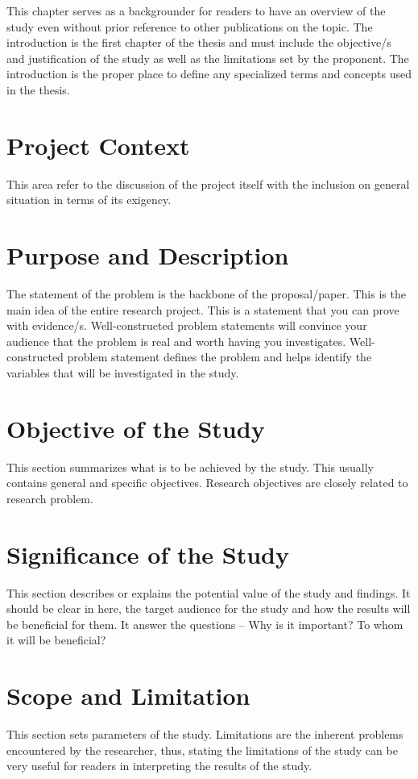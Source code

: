 This chapter serves as a backgrounder for readers to have an overview of the study even without prior reference to other publications on the topic. The introduction is the first chapter of the thesis and must include the objective/s and justification of the study as well as the limitations set by the proponent. The introduction is the proper place to define any specialized terms and concepts used in the thesis.
		
\section{Project Context}
This area refer to the discussion of the project itself with the inclusion on general situation in terms of its exigency. 

\section{Purpose and Description}
The statement of the problem is the backbone of the proposal/paper. This is the main idea of the entire research project.  This is a statement that you can prove with evidence/s. Well-constructed problem statements will convince your audience that the problem is real and worth having you investigates. Well-constructed problem statement defines the problem and helps identify the variables that will be investigated in the study.

\section{Objective of the Study} 
This section summarizes what is to be achieved by the study. This usually contains general and specific objectives.  Research objectives are closely related to research problem.

\section{Significance of the Study} 
This section describes or explains the potential value of the study and findings. It should be clear in here, the target audience for the study and how the results will be beneficial for them. It answer the questions – Why is it important? To whom it will be beneficial?

\section{Scope and Limitation} 
This section sets parameters of the study. Limitations are the inherent problems encountered by the researcher, thus, stating the limitations of the study can be very useful for readers in interpreting the results of the study.

